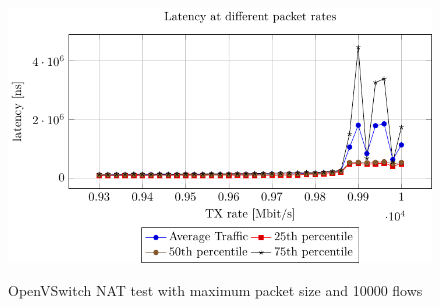 \documentclass[11pt,a4paper,twoside,openright,bachelor,english]{netthesis}
\begin{document}
\begin{figure}[H]
\centering
{\includegraphics[width=.90\columnwidth]{figures/TrafficOVSNATtestMaxPacketsizeFlow10000.pdf}} \quad
\caption[ OpenVSwitch NAT test with maximum packet size and 10000 flows]{OpenVSwitch NAT test with maximum packet size and 10000 flows }
\label{fig:TrafficOVSNATtestMaxPacketsizeFlow10000}
\end{figure}
\end{document}
